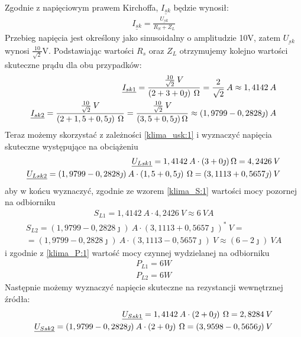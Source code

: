 \begin{task}
Zgodnie z napięciowym prawem Kirchoffa, $\underline{I_{sk}}$ będzie wynosił:
\begin{align}
\underline{I_{sk}}=\frac {\underline{U_{sk}} }{R_S + Z_L}
\end{align}
Przebieg napięcia jest określony jako sinusoidalny o amplitudzie 10V, zatem $\underline{U_{sk}}$ wynosi $\frac{10}{\sqrt{2}}$V.
Podstawiając wartości $R_s$ oraz $Z_L$ otrzymujemy kolejno wartości skuteczne prądu dla obu przypadków:
\begin{align}
\underline{I_{sk1}}=\frac{\frac{10}{\sqrt{2}} \:V}{(2+3+0 \jmath) \: \ohm}=\frac{2}{\sqrt{2}} \: A\approx 1,4142 \: A\\
\underline{I_{sk2}}=\frac{\frac{10}{\sqrt{2}} \:V}{(2+1,5+0,5 \jmath)  \:\ohm}=\frac{\frac{10}{\sqrt{2}} \:V}{(3,5+0,5 \jmath) \ohm}\approx (1,9799 - 0,2828 \jmath) \: A
\end{align}
Teraz możemy skorzystać z zależności \eqref{klima_usk:1} i wyznaczyć napięcia skuteczne występujące na obciążeniu
\begin{align}
\underline{U_{Lsk1}}=1,4142 \: A\cdot (3+0 \jmath)\ohm = 4,2426 \: V\\
\underline{U_{Lsk2}}=(1,9799 - 0,2828 \jmath) \: A \cdot (1,5+0,5 \jmath) \:\ohm = (3,1113 + 0,5657 \jmath) \: V
\end{align}
aby w końcu wyznaczyć, zgodnie ze wzorem \eqref{klima_S:1} wartości mocy pozornej na odbiorniku
\begin{align}
S_{L1} = 1,4142 \: A \cdot 4,2426 \: V \approx 6 \: VA
\end{align}
\begin{multline}
S_{L2} = (1,9799 - 0,2828 \jmath) \: A\cdot (3,1113 + 0,5657 \jmath)^* \: V=\\=(1,9799 - 0,2828 \jmath) \: A \cdot (3,1113 - 0,5657 \jmath) \: V \approx (6-2 \jmath) \: VA
\end{multline}
i zgodnie z \eqref{klima_P:1} wartość mocy czynnej wydzielanej na odbiorniku
\begin{align}
\label{klima_wynikPL:1}
P_{L1} = 6 W\\
\label{klima_wynikPL:2}
P_{L2} = 6 W
\end{align}
Następnie możemy wyznaczyć napięcie skuteczne na rezystancji wewnętrznej źródła:
\begin{align}
\underline{U_{Ssk1}}=1,4142 \: A\cdot (2+0 \jmath) \:\ohm = 2,8284 \: V\\
\underline{U_{Ssk2}}=(1,9799 - 0,2828 \jmath) \: A\cdot (2+0 \jmath) \:\ohm = (3,9598 - 0,5656 \jmath)  \:V
\end{align}

\end{task}
